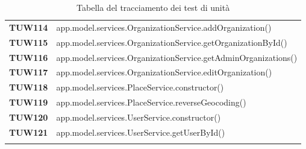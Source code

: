 \documentclass[../../piano-di-qualifica.tex]{subfiles}
\begin{document}
\begin{longtable}[H]{>{\centering\bfseries}m{3cm} >{}m{13cm}}
  TUW114             & app.model.services.OrganizationService.addOrganization\@()                                              \\


  TUW115             & app.model.services.OrganizationService.getOrganizationById\@()                                          \\

  TUW116             & app.model.services.OrganizationService.getAdminOrganizations\@()                                        \\

  TUW117             & app.model.services.OrganizationService.editOrganization\@()                                             \\



  TUW118             & app.model.services.PlaceService.constructor\@()                                                         \\

  TUW119             & app.model.services.PlaceService.reverseGeocoding\@()                                                    \\


  TUW120             & app.model.services.UserService.constructor\@()                                                          \\

  TUW121             & app.model.services.UserService.getUserById\@()                                                          \\



  \rowcolor{white}
  \caption{Tabella del tracciamento dei test di unità}%
  \label{tab:tabella_tracciamento_test_di_unita}
\end{longtable}


\end{document}

